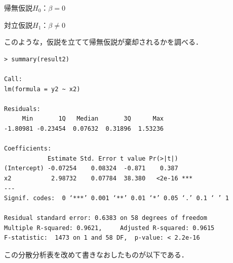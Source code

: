 \documentclass[a4paper,10pt,fleqn]{jarticle}
\begin{document}
{\large 帰無仮説$H_0$：$\beta=0$

対立仮説$H_1$：$\beta \ne 0$}

このような，仮説を立てて帰無仮説が棄却されるかを調べる．
\begin{breakbox}
\begin{verbatim}
> summary(result2)

Call:
lm(formula = y2 ~ x2)

Residuals:
     Min       1Q   Median       3Q      Max 
-1.80981 -0.23454  0.07632  0.31896  1.53236 

Coefficients:
            Estimate Std. Error t value Pr(>|t|)    
(Intercept) -0.07254    0.08324  -0.871    0.387    
x2           2.98732    0.07784  38.380   <2e-16 ***
---
Signif. codes:  0 ‘***’ 0.001 ‘**’ 0.01 ‘*’ 0.05 ‘.’ 0.1 ‘ ’ 1 

Residual standard error: 0.6383 on 58 degrees of freedom
Multiple R-squared: 0.9621,     Adjusted R-squared: 0.9615 
F-statistic:  1473 on 1 and 58 DF,  p-value: < 2.2e-16 
\end{verbatim}
\end{breakbox}
この分散分析表を改めて書きなおしたものが以下である．
\end{document}
